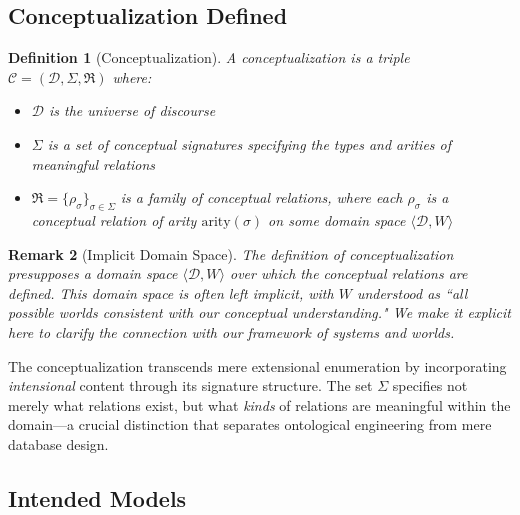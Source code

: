 \documentclass[12pt,a4paper]{article}
\newtheorem{definition}{Definition}[section]
\newtheorem{remark}[definition]{Remark}
\newcommand{\domain}{\mathcal{D}}
\newcommand{\concept}{\mathcal{C}}
\newcommand{\intrel}{\mathfrak{R}}
\begin{document}
\subsection{Conceptualization Defined}

\begin{definition}[Conceptualization]
\label{def:conceptualization}
A \emph{conceptualization} is a triple $\concept = (\domain, \Sigma, \intrel)$ where:
\begin{itemize}
    \item $\domain$ is the universe of discourse
    \item $\Sigma$ is a set of \emph{conceptual signatures} specifying the types and arities of meaningful relations
    \item $\intrel = \{\rho_\sigma\}_{\sigma \in \Sigma}$ is a family of \emph{conceptual relations}, where each $\rho_\sigma$ is a conceptual relation of arity $\text{arity}(\sigma)$ on some domain space $\langle \domain, W \rangle$
\end{itemize}
\end{definition}

\begin{remark}[Implicit Domain Space]
The definition of conceptualization presupposes a domain space $\langle \domain, W \rangle$ over which the conceptual relations are defined. This domain space is often left implicit, with $W$ understood as ``all possible worlds consistent with our conceptual understanding." We make it explicit here to clarify the connection with our framework of systems and worlds.
\end{remark}

The conceptualization transcends mere extensional enumeration by incorporating \emph{intensional} content through its signature structure. The set $\Sigma$ specifies not merely what relations exist, but what \emph{kinds} of relations are meaningful within the domain---a crucial distinction that separates ontological engineering from mere database design.

\subsection{Intended Models}
\end{document}

